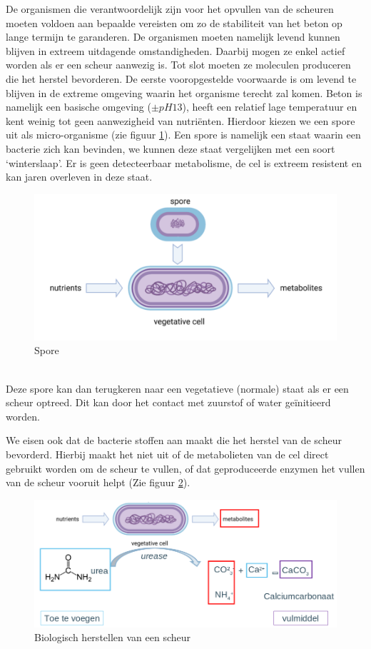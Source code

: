 \documentclass[a4paper,kul]{kulakarticle} %
\begin{document}
De organismen die verantwoordelijk zijn voor het opvullen van de scheuren moeten voldoen aan bepaalde vereisten om zo de stabiliteit van het beton op lange termijn te garanderen. De organismen moeten namelijk levend kunnen blijven in extreem uitdagende omstandigheden. Daarbij mogen ze enkel actief worden als er een scheur aanwezig is. Tot slot moeten ze moleculen produceren die het herstel bevorderen. 
\newpage
De eerste vooropgestelde voorwaarde is om levend te blijven in de extreme omgeving waarin het organisme terecht zal komen. Beton is namelijk een basische omgeving ($\pm pH 13$), heeft een relatief lage temperatuur en kent weinig tot geen aanwezigheid van nutriënten. Hierdoor kiezen we een spore uit als micro-organisme (zie figuur \ref{fig:spore}). Een spore is namelijk een staat waarin een bacterie zich kan bevinden, we kunnen deze staat vergelijken met een soort `winterslaap'. Er is geen detecteerbaar metabolisme, de cel is extreem resistent en kan jaren overleven in deze staat. 
\begin{figure}[h]
	\centering
	\includegraphics[width=0.7\linewidth]{Spore}
	\caption[Spore]{Spore}
	\label{fig:spore}
\end{figure}\\
Deze spore kan dan terugkeren naar een vegetatieve (normale) staat als er een scheur optreed. Dit kan door het contact met zuurstof of water geïnitieerd  worden.

We eisen ook dat de bacterie stoffen aan maakt die het herstel van de scheur bevorderd. Hierbij maakt het niet uit of de metabolieten van de cel direct gebruikt worden om de scheur te vullen, of dat geproduceerde enzymen het vullen van de scheur vooruit helpt (Zie figuur \ref{fig:herstelscheur}).
\begin{figure}[h]
	\centering
	\includegraphics[width=0.7\linewidth]{HerstelScheur}
	\caption[Biologisch herstellen scheur]{Biologisch herstellen van een scheur}
	\label{fig:herstelscheur}
\end{figure}
\newpage
\end{document}
